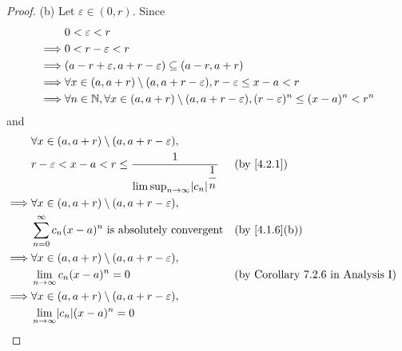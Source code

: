 \begin{proof}{(b)}
  Let \(\varepsilon \in (0, r)\).
  Since
  \begin{align*}
             & 0 < \varepsilon < r                                                                                                     \\
    \implies & 0 < r - \varepsilon < r                                                                                                 \\
    \implies & (a - r + \varepsilon, a + r - \varepsilon) \subseteq (a - r, a + r)                                                     \\
    \implies & \forall x \in (a, a + r) \setminus (a, a + r - \varepsilon), r - \varepsilon \leq x - a < r                             \\
    \implies & \forall n \in \mathbb{N}, \forall x \in (a, a + r) \setminus (a, a + r - \varepsilon), (r - \varepsilon)^n \leq (x - a)^n < r^n
  \end{align*}
  and
  \begin{align*}
             & \forall x \in (a, a + r) \setminus (a, a + r - \varepsilon),                                                                               \\
             & r - \varepsilon < x - a < r \leq \dfrac{1}{\limsup_{n \to \infty} \abs{c_n}^{\dfrac{1}{n}}} &  & \text{(by \cref{4.2.1})}                  \\
    \implies & \forall x \in (a, a + r) \setminus (a, a + r - \varepsilon),                                                                               \\
             & \sum_{n = 0}^\infty c_n (x - a)^n \text{ is absolutely convergent}                          &  & \text{(by \cref{4.1.6}(b))}               \\
    \implies & \forall x \in (a, a + r) \setminus (a, a + r - \varepsilon),                                                                               \\
             & \lim_{n \to \infty} c_n (x - a)^n = 0                                                       &  & \text{(by Corollary 7.2.6 in Analysis I)} \\
    \implies & \forall x \in (a, a + r) \setminus (a, a + r - \varepsilon),                                                                               \\
             & \lim_{n \to \infty} \abs{c_n} (x - a)^n = 0                                                                                                \\

\end{align*}
\end{proof}
